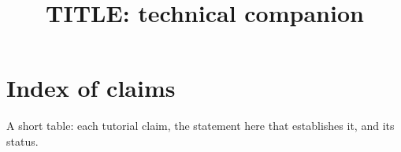 \documentclass[11pt]{article}
\title{ {{TITLE}}: technical companion }
\author{}
\date{}
\begin{document}
\maketitle


\tableofcontents

\section{Index of claims}

A short table: each tutorial claim, the statement here that establishes it, and its status.
\end{document}
